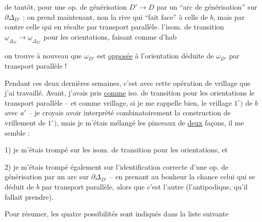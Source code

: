 de tantôt, pour  une op. de générisation $D'\longrightarrow D$ par un ``arc de générisation'' sur $\partial\Delta_{D'}$ ; on prend maintenant, non la rive qui ``fait face'' à celle de $b$, mais par contre celle qui en résulte par transport parallèle.   l'isom. de transition $\underline{\omega}_{\Delta_D}\longrightarrow\underline{\omega}_{\Delta_{D'}}$ pour les orientations, faisant comme d'hab

on trouve à nouveau que $\omega_{D'}$ est \uline{opposée} à l'orientation  déduite de $\omega_{D'}$ par transport parallèle !

Pendant ces deux dernières semaines, c'est avec cette opération de vrillage que j'ai travaillé. Avant, j'avais pris  \uline{comme} iso. de transition pour les orientations le transport parallèle --  et comme  vrillage, si je me rappelle bien, le vrillage $1^\circ)$ de $b$ avec $a'$ -- je croyais avoir interprété combinatoirement la construction de vrillement de $1^\circ)$, mais je m'étais mélangé les pinceaux de \uline{deux} façons, il me semble :

1) je m'étais trompé sur les isom. de transition pour les orientations, et

2) je m'étais trompé également sur l'identification correcte d'une op. de générisation  par un arc sur $\partial\Delta_{D'}$ -- en prenant au bonheur la chance celui qui   se déduit de \uline{$b$} par transport parallèle, alors que c'est l'autre  (l'antipodique, qu'il fallait prendre).

Pour résumer, les quatre possibilités sont indiqués dans la liste suivante
